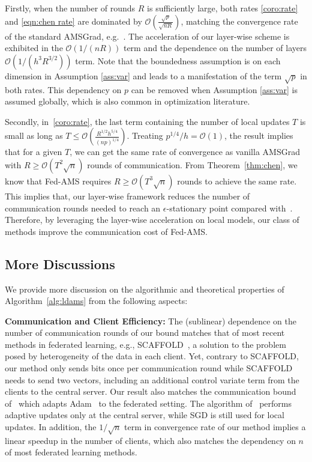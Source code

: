 \documentclass[nohyperref]{article}
\theoremstyle{plain}
\theoremstyle{definition}
\theoremstyle{remark}
\begin{document}
Firstly, when the number of rounds $R$ is sufficiently large, both rates \eqref{coro:rate} and \eqref{eqn:chen rate} are dominated by $\mathcal O(\frac{\sqrt p}{\sqrt{n R}})$, matching the convergence rate of the standard AMSGrad, e.g.~\cite{Arxiv:Zhou_18}.
The acceleration of our layer-wise scheme is exhibited in the $\mathcal O(1/(n R))$ term and the dependence on the number of layers $\mathcal O(1/(h^3 R^{3/2}))$ term. Note that the boundedness assumption is on each dimension in Assumption \ref{ass:var} and leads to a manifestation of the term $\sqrt{p}$ in both rates. This dependency on $p$ can be removed when Assumption \ref{ass:var} is assumed globally, which is also common in optimization literature.

Secondly, in~\eqref{coro:rate}, the last term containing the number of local updates $T$ is small as long as $T\leq \mathcal O(\frac{R^{1/2}h^{5/4}}{(np)^{1/4}})$. 
Treating $p^{1/4}/h=\mathcal O(1)$, the result implies that for a given $T$, we can get the same rate of convergence as vanilla AMSGrad with $R\geq \mathcal{O}(T^2\sqrt n)$ rounds of communication. From Theorem~\ref{thm:chen}, we know that Fed-AMS requires $R\geq \mathcal O(T^3\sqrt n)$ rounds to achieve the same rate. This implies that, our layer-wise framework reduces the number of communication rounds needed to reach an $\epsilon$-stationary point compared with~\citet{chen2020toward}. Therefore, by leveraging the layer-wise acceleration on local models, our class of methods improve the communication cost of Fed-AMS.


\vspace{-0.05in}
\subsection{More Discussions}

We provide more discussion on the algorithmic and theoretical properties of Algorithm~\ref{alg:ldams} from the following aspects:


\noindent\textbf{Communication and Client Efficiency:} The (sublinear) dependence on the number of communication rounds of our bound matches that of most recent methods in federated learning, e.g., SCAFFOLD~\citep{karimireddy2019scaffold}, a solution to the problem posed by heterogeneity of the data in each client. Yet, contrary to SCAFFOLD, our method only sends bits once per communication round while SCAFFOLD needs to send two vectors, including an additional control variate term  from the clients to the central server. Our result also matches the communication bound of~\citet{reddi2020adaptive} which adapts Adam~\citep{KB15} to the federated setting. The algorithm of~\citet{reddi2020adaptive} performs adaptive updates only at the central server, while SGD is still used for local updates. In addition, the $1/\sqrt n$ term in convergence rate of our method implies a linear speedup  in the number of clients, which also matches the dependency on $n$ of most federated learning methods. 
\end{document}
